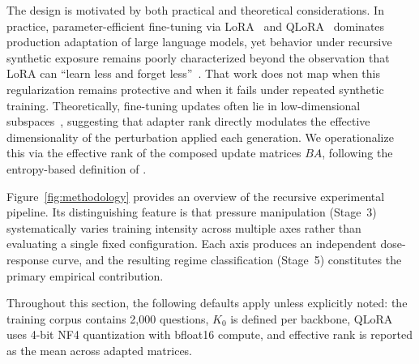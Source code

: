 \documentclass[a4paper,fleqn]{cas-dc}
\begin{document}
The design is motivated by both practical and theoretical considerations. In
practice, parameter-efficient fine-tuning via LoRA~\citep{hu2022} and
QLoRA~\citep{dettmers2023} dominates production adaptation of large language
models, yet behavior under recursive synthetic exposure remains poorly
characterized beyond the observation that LoRA can ``learn less and forget
less''~\citep{biderman2024}. That work does not map when this regularization
remains protective and when it fails under repeated synthetic training.
Theoretically, fine-tuning updates often lie in low-dimensional
subspaces~\citep{aghajanyan2021}, suggesting that adapter rank directly
modulates the effective dimensionality of the perturbation applied each
generation. We operationalize this via the effective rank of the composed update
matrices $BA$, following the entropy-based definition of
\citet{roy2007}.

Figure~\ref{fig:methodology} provides an overview of the recursive experimental
pipeline. Its distinguishing feature is that pressure manipulation (Stage~3)
systematically varies training intensity across multiple axes rather than
evaluating a single fixed configuration. Each axis produces an independent
dose-response curve, and the resulting regime classification (Stage~5)
constitutes the primary empirical contribution.

Throughout this section, the following defaults apply unless explicitly noted:
the training corpus contains 2{,}000 questions, $K_0$ is defined per backbone,
QLoRA uses 4-bit NF4 quantization with bfloat16 compute, and effective rank is
reported as the mean across adapted matrices.
\end{document}
